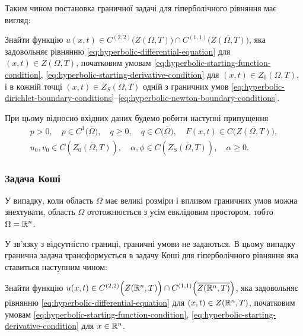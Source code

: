 Таким чином постановка граничної задачі для гіперболічного рівняння має вигляд:
\begin{problem_formulation*}
    Знайти функцію $u(x, t) \in C^{(2, 2)} \Big( Z(\Omega, T) \Big) \cap C^{(1, 1)} \Big( \overline {Z(\Omega, T)} \Big)$, яка задовольняє рівнянню \eqref{eq:hyperbolic-differential-equation} для $(x, t) \in Z(\Omega, T)$, початковим умовам \eqref{eq:hyperbolic-starting-function-condition}, \eqref{eq:hyperbolic-starting-derivative-condition} для $(x, t) \in Z_0(\Omega, T)$, і в кожній точці $(x, t) \in Z_S(\Omega, T)$ одній з граничних умов \eqref{eq:hyperbolic-dirichlet-boundary-conditions}--\eqref{eq:hyperbolic-newton-boundary-conditions}.
\end{problem_formulation*}

\begin{remark}
    При цьому відносно вхідних даних будемо робити наступні припущення
    \begin{gather}
        p > 0, \quad p \in C^1 \Big( \overline \Omega \Big), \quad q \ge 0, \quad q \in C \Big( \overline \Omega \Big), \quad F(x, t) \in C \Big( \overline{Z(\Omega, T)} \Big), \\
        u_0, v_0 \in C \left( \overline{Z_0(\Omega, T)} \right), \quad \alpha, \phi \in C \left( \overline{Z_S(\Omega, T)} \right), \quad \alpha \ge 0.
    \end{gather}
\end{remark}

\subsubsection{Задача Коші}

У випадку, коли область $\Omega$ має великі розміри і впливом граничних умов можна знехтувати, область $\Omega$ ототожнюється з усім евклідовим простором, тобто $\Omega = \mathbb{R}^n$. \medskip

У зв'язку з відсутністю границі, граничні умови не задаються. В цьому випадку гранична задача трансформується в задачу Коші для гіперболічного рівняння яка ставиться наступним чином: 
\begin{problem_formulation*}
    Знайти функцію $u(x, t) \in C^{(2, 2)} \Big( Z(\mathbb{R}^n, T) \Big) \cap C^{(1, 1)} \Big( \overline {Z(\mathbb{R}^n, T)} \Big)$, яка задовольняє рівнянню \eqref{eq:hyperbolic-differential-equation} для $(x, t) \in Z(\mathbb{R}^n, T)$, початковим умовам \eqref{eq:hyperbolic-starting-function-condition}, \eqref{eq:hyperbolic-starting-derivative-condition} для $x \in \mathbb{R}^n$.
\end{problem_formulation*}

